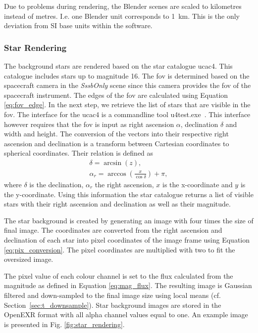 Due to problems during rendering, the Blender scenes are scaled to kilometres instead of metres. I.e. one Blender unit corresponds to \SI{1}{\kilo\meter}. This is the only deviation from SI base units within the software.

\subsubsection{Star Rendering} \label{sec:stars}
The background stars are rendered based on the star catalogue \gls{ucac4}. This catalogue includes stars up to magnitude 16. The \gls{fov} is determined based on the spacecraft camera in the \textit{SssbOnly} scene since this camera provides the \gls{fov} of the spacecraft instrument. The edges of the \gls{fov} are calculated using Equation \ref{eq:fov_edge}. 
In the next step, we retrieve the list of stars that are visible in the \gls{fov}. The interface for the \gls{ucac4} is a commandline tool u4test.exe~\cite{gray}. This interface however requires that the \gls{fov} is input as right ascension $\alpha$, declination $\delta$ and width and height.
The conversion of the vectors into their respective right ascension and declination is a transform between Cartesian coordinates to spherical coordinates. Their relation is defined as
\begin{align}
    \delta = \arcsin{(z)}, \label{eq:declination} \\
    \alpha_r = \arccos{\left(\frac{x}{\cos{\delta}}\right)} + \pi, \label{eq:right_ascension}
\end{align}
where $\delta$ is the declination, $\alpha_r$ the right ascension, $x$ is the x-coordinate and $y$ is the y-coordinate. Using this information the star catalogue returns a list of visible stars with their right ascension and declination as well as their magnitude.

The star background is created by generating an image with four times the size of final image. The coordinates are converted from the right ascension and declination of each star into pixel coordinates of the image frame using Equation \ref{eq:pix_conversion}. The pixel coordinates are multiplied with two to fit the oversized image.

The pixel value of each colour channel is set to the flux calculated from the magnitude as defined in Equation \ref{eq:mag_flux}. The resulting image is Gaussian filtered and down-sampled to the final image size using local means (cf. Section~\ref{sec:t_downsample}). Star background images are stored in the OpenEXR format with all alpha channel values equal to one. An example image is presented in Fig. \ref{fig:star_rendering}.

